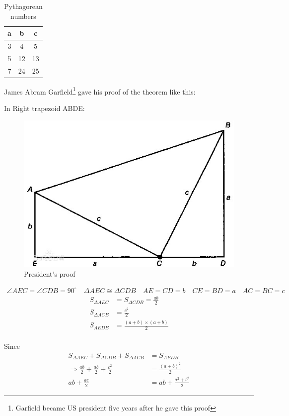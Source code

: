 \documentclass{article} %
\begin{document}
\begin{table}[H]
\centering
\setlength{\tabcolsep}{10mm}
\begin{tabular}{@{}ccc@{}}
\toprule
a & b  & c  \\ \midrule
3 & 4  & 5  \\
5 & 12 & 13 \\
7 & 24 & 25 \\ \bottomrule
\end{tabular}
\caption{Pythagorean numbers}
\label{tab:my-table}
\end{table}

James Abram Garfield\footnote{Garfield became US president five years after he gave this proof} gave his proof of the theorem like this:

In Right trapezoid ABDE:
\begin{figure}[H]
    \centering
    \includegraphics[scale = 0.3]{image/proof.jpg}
    \caption{President's proof}
    \label{fig:enter-label}
\end{figure}
\begin{align*}
    \angle{AEC} = \angle{CDB} = 90^{\circ}\quad \Delta{AEC}\cong \Delta{CDB}\quad AE = CD = b\quad CE = BD = a\quad AC = BC = c
\end{align*}
\begin{align*}
    S_{\Delta AEC} &= S_{\Delta CDB} =\frac{ab}{2}\\
    S_{\Delta ACB} &= \frac{c^2}{2}\\
    S_{AEDB} &= \frac{(a+b)\times(a+b)}{2}\\
\end{align*}

Since
\begin{align*}
    S_{\Delta AEC} + S_{\Delta CDB}+S_{\Delta ACB} &= S_{AEDB}\\
    \Longrightarrow \frac{ab}{2}+\frac{ab}{2}+\frac{c^2}{2}&=\frac{(a+b)^2}{2}\\
    ab +\frac{ac}{2} &= ab + \frac{a^2+b^2}{2}
\end{align*}
\end{document}
